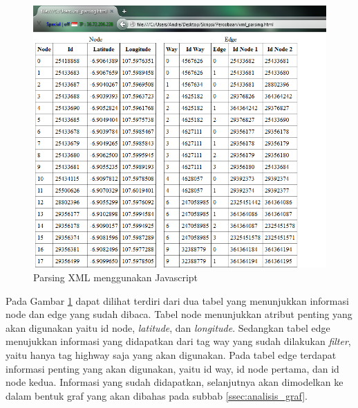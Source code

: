 \begin{figure}[h]
\centering
\includegraphics[scale=0.5]{Gambar/xml_parsing}
\caption[Parsing XML menggunakan Javascript]{Parsing XML menggunakan
Javascript}
\label{fig:xml_parsing}
\end{figure}

Pada Gambar \ref{fig:xml_parsing} dapat dilihat terdiri dari dua tabel yang
menunjukkan informasi node dan edge yang sudah dibaca. Tabel node menunjukkan
atribut penting yang akan digunakan yaitu id node, \textit{latitude}, dan
\textit{longitude}. Sedangkan tabel edge menujukkan informasi yang didapatkan
dari tag way yang sudah dilakukan \textit{filter}, yaitu hanya tag highway saja
yang akan digunakan. Pada tabel edge terdapat informasi penting yang
akan digunakan, yaitu id way, id node pertama, dan id node kedua. Informasi yang
sudah didapatkan, selanjutnya akan dimodelkan ke dalam bentuk graf yang akan
dibahas pada subbab \ref{ssec:analisis_graf}.


